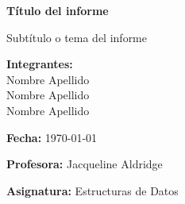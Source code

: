 \documentclass{article}
\begin{document}
\begin{titlepage}
\centering

\vspace{0.5cm}

{\LARGE\bfseries Título del informe \par}
{\large Subtítulo o tema del informe \par}
\vspace{1cm}

{\large\textbf{Integrantes:}\\
Nombre Apellido \\
Nombre Apellido \\
Nombre Apellido \\
}
\vspace{0.5cm}

\textbf{Fecha:} \today \\
\vspace{0.5cm}

{\large\textbf{Profesora:} Jacqueline Aldridge \par}
{\large\textbf{Asignatura:} Estructuras de Datos \par}
\vfill
\end{titlepage}

\tableofcontents
\newpage
\end{document}
